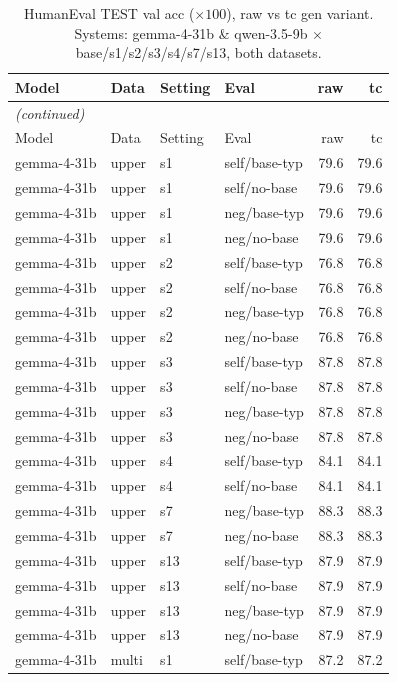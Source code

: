 {\small
\begin{longtable}{llll rr}
\caption{HumanEval TEST val acc ($\times100$), raw vs tc gen variant. Systems: gemma-4-31b \& qwen-3.5-9b $\times$ base/s1/s2/s3/s4/s7/s13, both datasets.}\label{tab:he_test_val_acc}\\
\toprule
Model & Data & Setting & Eval & raw & tc \\
\midrule
\endfirsthead
\multicolumn{6}{l}{\itshape (continued)}\\
\toprule
Model & Data & Setting & Eval & raw & tc \\
\midrule
\endhead
\bottomrule
\endfoot
gemma-4-31b & upper & s1 & self/base-typ & 79.6 & 79.6 \\
gemma-4-31b & upper & s1 & self/no-base & 79.6 & 79.6 \\
gemma-4-31b & upper & s1 & neg/base-typ & 79.6 & 79.6 \\
gemma-4-31b & upper & s1 & neg/no-base & 79.6 & 79.6 \\
gemma-4-31b & upper & s2 & self/base-typ & 76.8 & 76.8 \\
gemma-4-31b & upper & s2 & self/no-base & 76.8 & 76.8 \\
gemma-4-31b & upper & s2 & neg/base-typ & 76.8 & 76.8 \\
gemma-4-31b & upper & s2 & neg/no-base & 76.8 & 76.8 \\
gemma-4-31b & upper & s3 & self/base-typ & 87.8 & 87.8 \\
gemma-4-31b & upper & s3 & self/no-base & 87.8 & 87.8 \\
gemma-4-31b & upper & s3 & neg/base-typ & 87.8 & 87.8 \\
gemma-4-31b & upper & s3 & neg/no-base & 87.8 & 87.8 \\
gemma-4-31b & upper & s4 & self/base-typ & 84.1 & 84.1 \\
gemma-4-31b & upper & s4 & self/no-base & 84.1 & 84.1 \\
gemma-4-31b & upper & s7 & neg/base-typ & 88.3 & 88.3 \\
gemma-4-31b & upper & s7 & neg/no-base & 88.3 & 88.3 \\
gemma-4-31b & upper & s13 & self/base-typ & 87.9 & 87.9 \\
gemma-4-31b & upper & s13 & self/no-base & 87.9 & 87.9 \\
gemma-4-31b & upper & s13 & neg/base-typ & 87.9 & 87.9 \\
gemma-4-31b & upper & s13 & neg/no-base & 87.9 & 87.9 \\
\midrule
gemma-4-31b & multi & s1 & self/base-typ & 87.2 & 87.2 \\

\end{longtable}}
